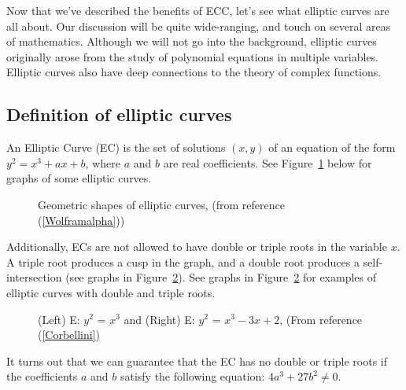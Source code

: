 Now that we've described the benefits of ECC, let's see what elliptic curves are all about. Our discussion will be quite wide-ranging, and touch on several areas of mathematics. Although we will not go into the background, elliptic curves originally arose from the study of polynomial equations in multiple variables. Elliptic curves also have deep connections to the theory of complex functions. 

\subsection{Definition of elliptic curves}
\label{subsec:FurtherCryptography:EllipticalCurve:Definition}

An Elliptic Curve (EC) is the set of solutions $(x,y)$ of  an equation of the form $y^2 = x^3 + ax + b$, where $a$ and $b$ are real coefficients.  See Figure~\ref{fig:DH:DHKE_5} below for graphs of some elliptic  curves.  
\begin{figure}[htbp]
	  \caption{\label{fig:DH:DHKE_5}  Geometric shapes of elliptic curves, (from reference (\ref{Wolframalpha}))}
\end{figure}
Additionally, ECs are not allowed to have double or triple roots in the variable $x$.  A triple root produces a cusp in the graph, and a double root produces a self-intersection (see graphs in Figure~\ref{fig:DH:DHKE_10}). See graphs in Figure~\ref{fig:DH:DHKE_10} for examples of elliptic curves with double and triple roots.
\begin{figure}[htbp]
	  \caption{\label{fig:DH:DHKE_10}(Left) E: $ y^2$ = $x^3$ and (Right) E: $ y^2$ = $x^3-3x+2$, (From reference (\ref{Corbellini})}
\end{figure}
 It turns out that we can guarantee that the EC has no double or triple roots if the coefficients $a$ and $b$ satisfy the following equation: $4a^3 + 27b^2 \neq 0$. 


